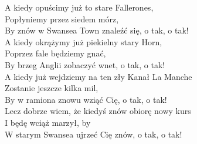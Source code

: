 A kiedy opuścimy już to stare Fallerones, \\
Popłyniemy przez siedem mórz, \\
By znów w Swansea Town znaleźć się, o tak, o tak! \\

A kiedy okrążymy już piekielny stary Horn, \\
Poprzez fale będziemy gnać, \\
By brzeg Anglii zobaczyć wnet, o tak, o tak! \\

A kiedy już wejdziemy na ten zły Kanał La Manche \\
Zostanie jeszcze kilka mil, \\
By w ramiona znowu wziąć Cię, o tak, o tak! \\

Lecz dobrze wiem, że kiedyś znów obiorę nowy kurs \\
I będę wciąż marzył, by \\
W starym Swansea ujrzeć Cię znów, o tak, o tak! \\